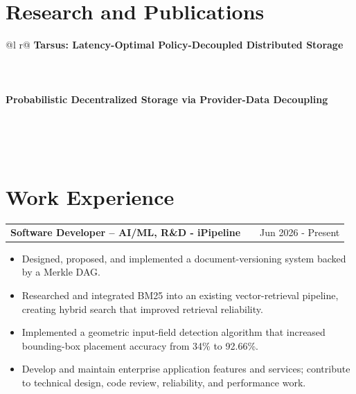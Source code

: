 \documentclass[a4paper,12pt]{article}
\makeatletter
\newenvironment{joblong}[2]
    {
    \begin{tabularx}{\linewidth}{@{}l X r@{}}
    \textbf{#1} & \hfill &  #2 \\[3.75pt]
    \end{tabularx}
    \begin{minipage}[t]{\linewidth}
    \begin{itemize}[nosep,after=\strut, leftmargin=1em, itemsep=3pt,label=--]
    }
    {
    \end{itemize}
    \end{minipage}
    }
\makeatother
\begin{document}

\section{Research and Publications}
\begin{tabularx}{\linewidth}{ @{}l r@{} }
\textbf{Tarsus: Latency-Optimal Policy-Decoupled Distributed Storage} \\
 \\[3.75pt]
 \\
\\
\textbf{Probabilistic Decentralized Storage via Provider-Data Decoupling} \\
 \\[3.75pt]
 \\
\end{tabularx}
\\


\section{Work Experience}

\begin{joblong}{Software Developer -- AI/ML, R\&D - iPipeline}{Jun 2026 - Present}
\item Designed, proposed, and implemented a document-versioning system backed by a Merkle DAG.
\item Researched and integrated BM25 into an existing vector-retrieval pipeline, creating hybrid search that improved retrieval reliability.
\item Implemented a geometric input-field detection algorithm that increased bounding-box placement accuracy from 34\% to 92.66\%.
\item Develop and maintain enterprise application features and services; contribute to technical design, code review, reliability, and performance work.
\end{joblong}
\end{document}
